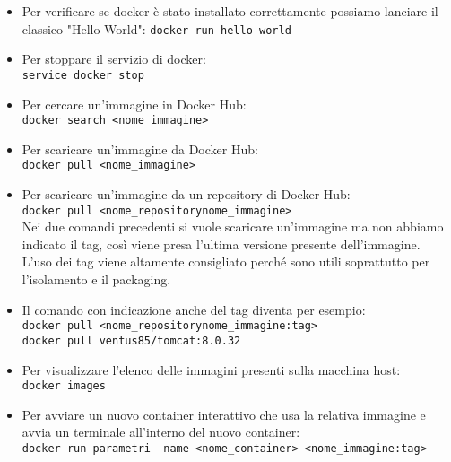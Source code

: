 \begin{itemize}
\item Per verificare se docker è stato installato correttamente possiamo lanciare il classico "Hello World":
\texttt{docker run hello-world}\\

\item Per stoppare il servizio di docker:\\
\texttt{service docker stop}\\

\item Per cercare un'immagine in Docker Hub:\\
\texttt{docker search <nome\_immagine>}\\

\item Per scaricare un'immagine da Docker Hub:\\
\texttt{docker pull <nome\_immagine>}\\

\item Per scaricare un'immagine da un repository di Docker Hub:\\
\texttt{docker pull <nome\_repository\/nome\_immagine>}\\

 Nei due comandi precedenti si vuole scaricare un'immagine ma non abbiamo indicato il tag, così viene presa l'ultima versione presente dell'immagine. L'uso dei tag viene altamente consigliato perché sono utili soprattutto per l'isolamento e il packaging.\\

\item Il comando con indicazione anche del tag diventa per esempio:\\
\texttt{docker pull <nome\_repository\/nome\_immagine:tag>}\\
\texttt{docker pull ventus85/tomcat:8.0.32}\\

\item Per visualizzare l'elenco delle immagini presenti sulla macchina host:\\
\texttt{docker images}\\

\item Per avviare un nuovo container interattivo che usa la relativa immagine e avvia un terminale all'interno del nuovo container:\\
\texttt{docker run parametri --name <nome\_container> <nome\_immagine:tag>}\\


\end{itemize}
